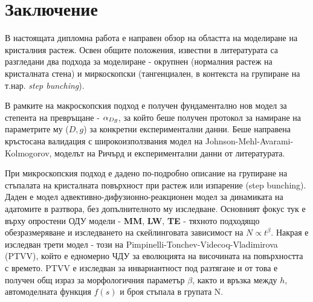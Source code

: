 \section{Заключение}
В настоящата дипломна работа е направен обзор на областта на моделиране на кристалния растеж. Освен общите положения, известни в литературата са разгледани два подхода за моделиране - окрупнен (нормалния растеж на кристалната стена) и миркоскопски (тангенциален, в контекста на групиране на т.нар. \textit{step bunching}).

В рамките на макроскопския подход е получен фундаментално нов модел за степента на превръщане - $\alpha_{Dg}$, за който беше получен протокол за намиране на параметрите му ($D, g$) за конкретни експериментални данни. Беше направена кръстосана валидация с широкоизползвания модел на Johnson-Mehl-Avarami-Kolmogorov, моделът на Ричърд и експериментални данни от литературата.

При микроскопския подход е дадено по-подробно описание на групиране на стъпалата на кристалната повърхност при растеж или изпарение (step bunching). Даден е модел адвективно-дифузионно-реакционен модел за динамиката на адатомите в разтвора, без допълнителното му изследване. Основният фокус тук е върху опростени ОДУ модели - \textbf{MM}, \textbf{LW}, \textbf{TE} - тяхното подходящо обезразмеряване и изследването на скейлинговата зависимост на $N \propto t^\beta$. Накрая е изследван трети модел - този на Pimpinelli-Tonchev-Videcoq-Vladimirova (PTVV), който е едномерно ЧДУ за еволюцията на височината на повърхността с времето. PTVV е изследван за инвариантност под разтягане и от това е получен общ израз за морфологичния параметър $\beta$, както и връзка между $h$, автомоделната функция $f(s)$ и броя стъпала в групата N.
